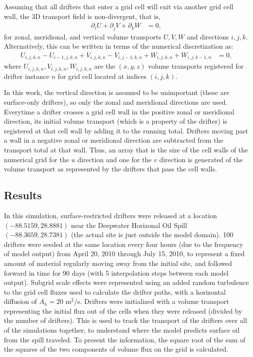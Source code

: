 \documentclass[11pt]{article}
\begin{document}
Assuming that all drifters that enter a grid cell will exit via another grid cell wall, the 3D transport field is non-divergent, that is,
\begin{align}
    \partial_i U + \partial_j V + \partial_k W &= 0, \label{transport}
\end{align}
for zonal, meridional, and vertical volume transports $U,V,W$ and directions $i,j,k$. Alternatively, this can be written in terms of the numerical discretization as:
\begin{align}
    U_{i,j,k,n} - U_{i-1,j,k,n} + V_{i,j,k,n} - V_{i,j-1,k,n} + W_{i,j,k,n} + W_{i,j,k-1,n} &= 0, \label{transport_discretized}
\end{align}
where $U_{i,j,k,n}, V_{i,j,k,n}, W_{i,j,k,n}$ are the $(x,y,z)$ volume transports registered for drifter instance $n$ for grid cell located at indices $(i,j,k)$. 

In this work, the vertical direction is assumed to be unimportant (these are surface-only drifters), so only the zonal and meridional directions are used. Everytime a drifter crosses a grid cell wall in the positive zonal or meridional direction, its initial volume transport (which is a property of the drifter) is registered at that cell wall by adding it to the running total. Drifters moving past a wall in a negative zonal or meridional direction are subtracted from the transport total at that wall. Thus, an array that is the size of the cell walls of the numerical grid for the $u$ direction and one for the $v$ direction is generated of the volume transport as represented by the drifters that pass the cell walls.  

\subsection{Results}

In this simulation, surface-restricted drifters were released at a location $(-88.5159,28.8881)$ near the Deepwater Horizonal Oil Spill $(-88.3659,28.7381)$ (the actual site is just outside the model domain). 100 drifters were seeded at the same location every four hours (due to the frequency of model output) from April 20, 2010 through July 15, 2010, to represent a fixed amount of material regularly moving away from the initial site, and followed forward in time for 90 days (with 5 interpolation steps between each model output). Subgrid scale effects were represented using an added random turbulence to the grid cell fluxes used to calculate the drifter paths, with a horizontal diffusion of $A_h=20$ m$^2$/s. Drifters were initialized with a volume transport representing the initial flux out of the cells when they were released (divided by the number of drifters). This is used to track the transport of the drifters over all of the simulations together, to understand where the model predicts surface oil from the spill traveled. To present the information, the square root of the sum of the squares of the two components of volume flux on the grid is calculated. 
\end{document}
